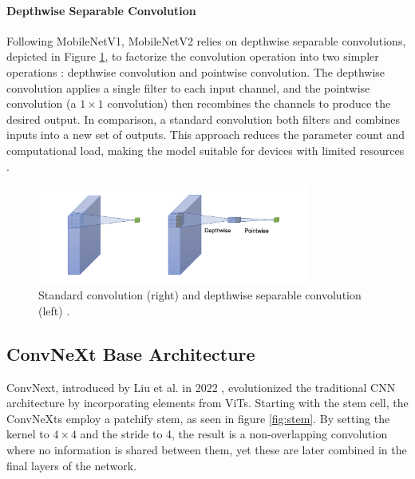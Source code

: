 \paragraph{Depthwise Separable Convolution}
Following MobileNetV1, MobileNetV2 relies on depthwise separable convolutions, depicted in Figure \ref{fig:depthwise_sep_conv}, to factorize the convolution operation into two simpler operations \cite{howard2017mobilenetsefficientconvolutionalneural}: depthwise convolution and pointwise convolution. The depthwise convolution applies a single filter to each input channel, and the pointwise convolution (a $1\times 1$ convolution) then recombines the channels to produce the desired output. In comparison, a standard convolution both filters and combines inputs into a new set of outputs. This approach reduces the parameter count and computational load, making the model suitable for devices with limited resources \cite{howard2017mobilenetsefficientconvolutionalneural,sandler2018mobilenetv2}.

\begin{figure}[ht]
    \centering
    \includegraphics[width=0.8\textwidth]{Images/depthwise_separable_conv.png} 
    \caption{Standard convolution (right) and depthwise separable convolution (left) \cite{guo2019depthwiseconvolutionneedlearning}.}
    \label{fig:depthwise_sep_conv}
\end{figure}





\subsection{ConvNeXt Base Architecture}
\label{sec:convnext}
ConvNext, introduced by Liu et al. in 2022 \cite{liu2022convnet2020s}, evolutionized the traditional CNN architecture by incorporating elements from ViTs. Starting with the stem cell, the ConvNeXts employ a patchify stem, as seen in figure \ref{fig:stem}. By setting the kernel to $4 \times 4$ and the stride to 4, the result is a non-overlapping convolution where no information is shared between them, yet these are later combined in the final layers of the network.  

